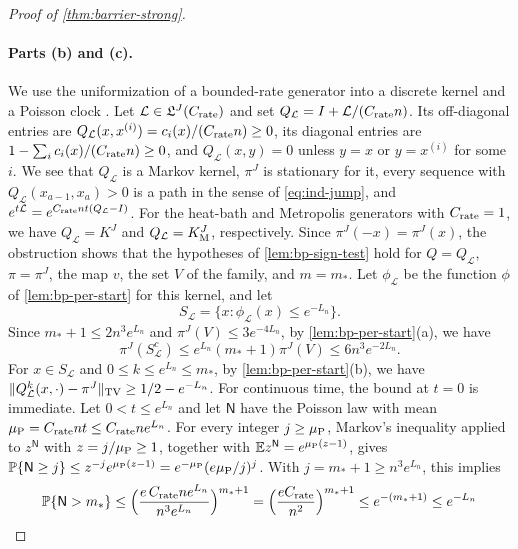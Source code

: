 \begin{proof}[Proof of \cref{thm:barrier-strong}]
\paragraph{Parts (b) and (c).} We use the uniformization of a bounded-rate generator into a discrete kernel and a Poisson clock \cite[Section~20.1]{levin-peres-2017}. Let $\mathcal L\in\mathfrak L^J(C_{\rm rate})$ and set $Q_{\mathcal L}=I+\mathcal L/(C_{\rm rate}n)$. Its off-diagonal entries are $Q_{\mathcal L}(x,x^{(i)})=c_i(x)/(C_{\rm rate}n)\ge0$, its diagonal entries are $1-\sum_ic_i(x)/(C_{\rm rate}n)\ge0$, and $Q_{\mathcal L}(x,y)=0$ unless $y=x$ or $y=x^{(i)}$ for some $i$. We see that $Q_{\mathcal L}$ is a Markov kernel, $\pi^J$ is stationary for it, every sequence with $Q_{\mathcal L}(x_{a-1},x_a)>0$ is a path in the sense of \eqref{eq:ind-jump}, and $e^{t\mathcal L}=e^{C_{\rm rate}nt(Q_{\mathcal L}-I)}$. For the heat-bath and Metropolis generators with $C_{\rm rate}=1$, we have $Q_{\mathcal L}=K^J$ and $Q_{\mathcal L}=K^J_{\rm M}$, respectively. Since $\pi^J(-x)=\pi^J(x)$, the obstruction shows that the hypotheses of \cref{lem:bp-sign-test} hold for $Q=Q_{\mathcal L}$, $\pi=\pi^J$, the map $v$, the set $V$ of the family, and $m=m_*$. Let $\phi_{\mathcal L}$ be the function $\phi$ of \cref{lem:bp-per-start} for this kernel, and let
\[
 S_{\mathcal L}=\{x:\phi_{\mathcal L}(x)\le e^{-L_n}\}.
\]
Since $m_*+1\le2n^3e^{L_n}$ and $\pi^J(V)\le3e^{-4L_n}$, by \cref{lem:bp-per-start}(a), we have
\begin{equation}\label{eq:bp-strong-starts}
 \pi^J(S_{\mathcal L}^c)\le e^{L_n}(m_*+1)\pi^J(V)\le6n^3e^{-2L_n}.
\end{equation}
For $x\in S_{\mathcal L}$ and $0\le k\le e^{L_n}\le m_*$, by \cref{lem:bp-per-start}(b), we have $\lVert Q_{\mathcal L}^k(x,\cdot)-\pi^J\rVert_{\mathrm{TV}}\ge1/2-e^{-L_n}$. For continuous time, the bound at $t=0$ is immediate. Let $0<t\le e^{L_n}$ and let $\mathsf N$ have the Poisson law with mean $\mu_{\rm P}=C_{\rm rate}nt\le C_{\rm rate}ne^{L_n}$. For every integer $j\ge\mu_{\rm P}$, Markov's inequality applied to $z^{\mathsf N}$ with $z=j/\mu_{\rm P}\ge1$, together with $\mathbb E z^{\mathsf N}=e^{\mu_{\rm P}(z-1)}$, gives $\mathbb P\{\mathsf N\ge j\}\le z^{-j}e^{\mu_{\rm P}(z-1)}=e^{-\mu_{\rm P}}(e\mu_{\rm P}/j)^j$. With $j=m_*+1\ge n^3e^{L_n}$, this implies
\begin{equation}\label{eq:bp-chernoff}
 \mathbb P\{\mathsf N>m_*\}\le\Bigl(\frac{e\,C_{\rm rate}ne^{L_n}}{n^3e^{L_n}}\Bigr)^{m_*+1}=\Bigl(\frac{eC_{\rm rate}}{n^2}\Bigr)^{m_*+1}\le e^{-(m_*+1)}\le e^{-L_n}
\end{equation}

\end{proof}
